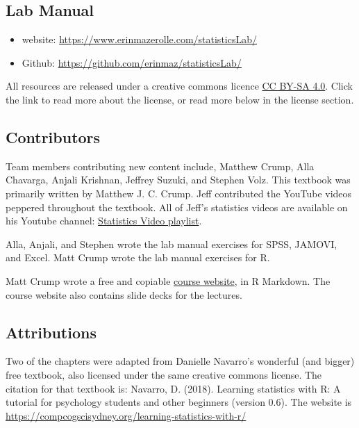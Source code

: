 \documentclass[
]{book}
\providecommand{\tightlist}{%
  \setlength{\itemsep}{0pt}\setlength{\parskip}{0pt}}
\begin{document}
\subsection{Lab Manual}\label{lab-manual}

\begin{itemize}
\tightlist
\item
  website: \url{https://www.erinmazerolle.com/statisticsLab/}
\item
  Github: \href{https://github.com/erinmaz/statisticsLab}{https://github.com/erinmaz/statisticsLab/}
\end{itemize}

All resources are released under a creative commons licence \href{https://creativecommons.org/licenses/by-sa/4.0/}{CC BY-SA 4.0}. Click the link to read more about the license, or read more below in the license section.

\subsection{Contributors}\label{contributors}

Team members contributing new content include, Matthew Crump, Alla Chavarga, Anjali Krishnan, Jeffrey Suzuki, and Stephen Volz. This textbook was primarily written by Matthew J. C. Crump. Jeff contributed the YouTube videos peppered throughout the textbook. All of Jeff's statistics videos are available on his Youtube channel: \href{https://www.youtube.com/playlist?list=PLKXdxQAT3tCvuex_E1ZnQYaw897ELUSaI}{Statistics Video playlist}.

Alla, Anjali, and Stephen wrote the lab manual exercises for SPSS, JAMOVI, and Excel. Matt Crump wrote the lab manual exercises for R.

Matt Crump wrote a free and copiable \href{https://crumplab.github.io/psyc3400/}{course website}, in R Markdown. The course website also contains slide decks for the lectures.

\subsection{Attributions}\label{attributions}

Two of the chapters were adapted from Danielle Navarro's wonderful (and bigger) free textbook, also licensed under the same creative commons license. The citation for that textbook is: Navarro, D. (2018). Learning statistics with R: A tutorial for psychology students and other beginners (version 0.6). The website is \url{https://compcogscisydney.org/learning-statistics-with-r/}
\end{document}
